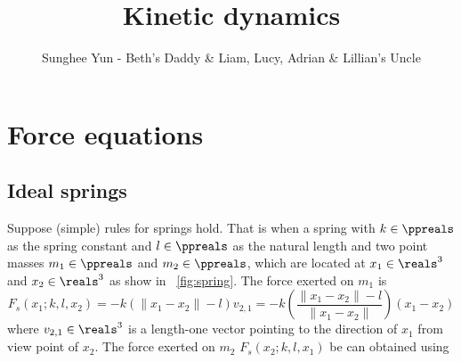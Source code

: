 \documentclass[12pt]{article}
\title{Kinetic dynamics}
\author{Sunghee Yun - Beth's Daddy \& Liam, Lucy, Adrian \& Lillian's Uncle}
\begin{document}
\maketitle
\tableofcontents

\section{Force equations}

\subsection{Ideal springs}

Suppose (simple) rules for springs hold. That is when a spring with $k\in\ppreals$ as the spring constant and $l\in\ppreals$ as the natural length
and two point masses $m_1\in\ppreals$ and $m_2\in\ppreals$, which are located at
$x_1\in\reals^3$
and
$x_2\in\reals^3$
as show in \figurename~\ref{fig:spring}.
The force exerted on $m_1$ is
\begin{equation}
\label{eq:force:spring}
	F_s(x_1;k,l,x_2) = -k (\|x_1-x_2\| - l) v_{2,1}
	= -k \left(\frac{\|x_1-x_2\| - l}{\|x_1-x_2\|}\right) (x_1-x_2)
\end{equation}
where $v_{2,1}\in\reals^3$ is a length-one vector pointing to the direction of $x_1$ from view point of $x_2$.
The force exerted on $m_2$ $F_s(x_2;k,l,x_1)$ be can obtained using 
\end{document}

